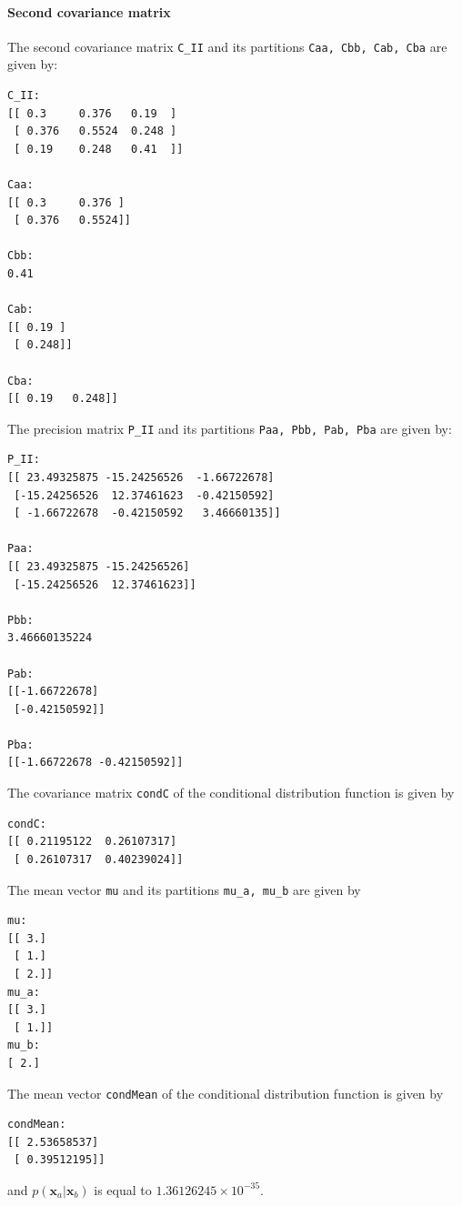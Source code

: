 \documentclass[a4paper,12pt]{article}
\newcommand{\mb}[1]{\ensuremath{\mathbf{#1}}}
\begin{document}
\paragraph{Second covariance matrix} The second covariance matrix \verb|C_II| and its partitions \verb|Caa, Cbb, Cab, Cba| are given by:
\begin{verbatim}
C_II:
[[ 0.3     0.376   0.19  ]
 [ 0.376   0.5524  0.248 ]
 [ 0.19    0.248   0.41  ]]
 
Caa:
[[ 0.3     0.376 ]
 [ 0.376   0.5524]]
 
Cbb:
0.41

Cab:
[[ 0.19 ]
 [ 0.248]]
 
Cba:
[[ 0.19   0.248]]
\end{verbatim}
The precision matrix \verb|P_II| and its partitions \verb|Paa, Pbb, Pab, Pba| are given by:
\begin{verbatim}
P_II:
[[ 23.49325875 -15.24256526  -1.66722678]
 [-15.24256526  12.37461623  -0.42150592]
 [ -1.66722678  -0.42150592   3.46660135]]
 
Paa:
[[ 23.49325875 -15.24256526]
 [-15.24256526  12.37461623]]
 
Pbb:
3.46660135224

Pab:
[[-1.66722678]
 [-0.42150592]]
 
Pba:
[[-1.66722678 -0.42150592]]
\end{verbatim}
The covariance matrix \verb|condC| of the conditional distribution function is given by
\begin{verbatim}
condC:
[[ 0.21195122  0.26107317]
 [ 0.26107317  0.40239024]]
\end{verbatim}
The mean vector \verb|mu| and its partitions \verb|mu_a, mu_b| are given by
\begin{verbatim}
mu:
[[ 3.]
 [ 1.]
 [ 2.]]
mu_a:
[[ 3.]
 [ 1.]]
mu_b:
[ 2.]
\end{verbatim}
The mean vector \verb|condMean| of the conditional distribution function is given by
\begin{verbatim}
condMean:
[[ 2.53658537]
 [ 0.39512195]]
\end{verbatim}
and $p(\mb{x}_a|\mb{x}_b)$ is equal to $1.36126245 \times 10^{-35}$.
\end{document}
